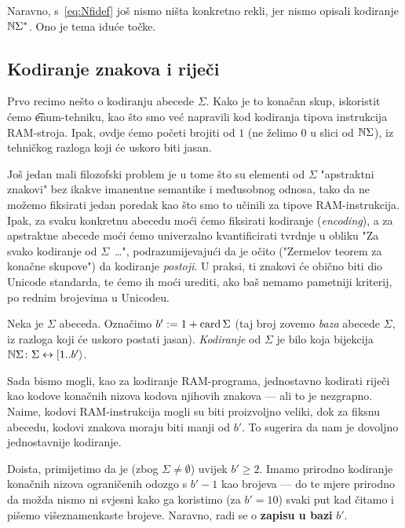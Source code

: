 Naravno, s~\eqref{eq:Nfidef} još nismo ništa konkretno rekli, jer nismo opisali kodiranje ${\mathbb N}\Sigma^*$. Ono je tema iduće točke.

\subsection{Kodiranje znakova i riječi}\label{sec:kSigma}

Prvo recimo nešto o kodiranju abecede $\Sigma$. Kako je to konačan skup, iskoristit ćemo \t{enum}-tehniku, kao što smo već napravili kod kodiranja tipova instrukcija RAM-stroja. Ipak, ovdje ćemo početi brojiti od $1$ (ne želimo $0$ u slici od ${\mathbb N}\Sigma$), iz tehničkog razloga koji će uskoro biti jasan.

Još jedan mali filozofski problem je u tome što su elementi od $\Sigma$ "apstraktni znakovi" bez ikakve imanentne semantike i međusobnog odnosa, tako da ne možemo fiksirati jedan poredak kao što smo to učinili za tipove RAM-instrukcija. Ipak, za svaku konkretnu abecedu moći ćemo fiksirati kodiranje (\emph{encoding}), a za apstraktne abecede moći ćemo univerzalno kvantificirati tvrdnje u obliku "Za svako kodiranje od $\Sigma$~\ldots", podrazumijevajući da je očito ("Zermelov teorem za konačne skupove") da kodiranje \emph{postoji}. U praksi, ti znakovi će obično biti dio Unicode standarda, te ćemo ih moći urediti, ako baš nemamo pametniji kriterij, po rednim brojevima u Unicodeu.

\begin{definicija}
Neka je $\Sigma$ abeceda. Označimo $b':=1+\operatorname{card}\Sigma$ (taj broj zovemo \emph{baza} abecede $\Sigma$, iz razloga koji će uskoro postati jasan). \emph{Kodiranje} od $\Sigma$ je bilo koja bijekcija ${\mathbb N}\Sigma\colon\Sigma\leftrightarrow[1..b'\rangle$.
\end{definicija}

Sada bismo mogli, kao za kodiranje RAM-programa, jednostavno kodirati riječi kao kodove konačnih nizova kodova njihovih znakova --- ali to je nezgrapno. Naime, kodovi RAM-instrukcija mogli su biti proizvoljno veliki, dok za fiksnu abecedu, kodovi znakova moraju biti manji od $b'$. To sugerira da nam je dovoljno jednostavnije kodiranje.

Doista, primijetimo da je (zbog $\Sigma\not=\emptyset$) uvijek $b'\ge2$. Imamo prirodno kodiranje konačnih nizova ograničenih odozgo s $b'-1$ kao brojeva --- do te mjere prirodno da možda nismo ni svjesni kako ga koristimo (za $b'=10$) svaki put kad čitamo i pišemo višeznamenkaste brojeve. Naravno, radi se o \textbf{zapisu u bazi} $b'$.

